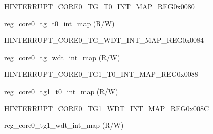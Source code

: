 \begin{register}{H}{INTERRUPT\_CORE0\_TG\_T0\_INT\_MAP\_REG}{0x0080}\label{regdesc:INTERRUPTCORE0TGT0INTMAPREG}
%
%
\regnewline%
\begin{regdesc}\begin{reglist}
\label{fielddesc:INTERRUPTCORE0TGT0INTMAP}\item [INTERRUPT\_CORE0\_TG\_T0\_INT\_MAP] reg\_core0\_tg\_t0\_int\_map (R/W)
\end{reglist}\end{regdesc}
\end{register}


\begin{register}{H}{INTERRUPT\_CORE0\_TG\_WDT\_INT\_MAP\_REG}{0x0084}\label{regdesc:INTERRUPTCORE0TGWDTINTMAPREG}
%
%
\regnewline%
\begin{regdesc}\begin{reglist}
\label{fielddesc:INTERRUPTCORE0TGWDTINTMAP}\item [INTERRUPT\_CORE0\_TG\_WDT\_INT\_MAP] reg\_core0\_tg\_wdt\_int\_map (R/W)
\end{reglist}\end{regdesc}
\end{register}


\begin{register}{H}{INTERRUPT\_CORE0\_TG1\_T0\_INT\_MAP\_REG}{0x0088}\label{regdesc:INTERRUPTCORE0TG1T0INTMAPREG}
%
%
\regnewline%
\begin{regdesc}\begin{reglist}
\label{fielddesc:INTERRUPTCORE0TG1T0INTMAP}\item [INTERRUPT\_CORE0\_TG1\_T0\_INT\_MAP] reg\_core0\_tg1\_t0\_int\_map (R/W)
\end{reglist}\end{regdesc}
\end{register}


\begin{register}{H}{INTERRUPT\_CORE0\_TG1\_WDT\_INT\_MAP\_REG}{0x008C}\label{regdesc:INTERRUPTCORE0TG1WDTINTMAPREG}
%
%
\regnewline%
\begin{regdesc}\begin{reglist}
\label{fielddesc:INTERRUPTCORE0TG1WDTINTMAP}\item [INTERRUPT\_CORE0\_TG1\_WDT\_INT\_MAP] reg\_core0\_tg1\_wdt\_int\_map (R/W)
\end{reglist}\end{regdesc}
\end{register}


